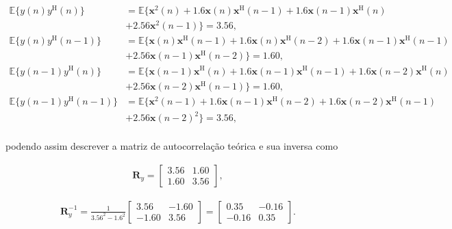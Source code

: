 \documentclass[a4paper,10pt]{article}
\begin{document}
\begin{enumerate}
\begin{enumerate}
						\begin{align*}
							\mathbb{E}\{y(n)y^{\text{H}}(n)\} &= \mathbb{E}\{ \mathbf{x}^{2}(n) + 1.6 \mathbf{x}(n) \mathbf{x}^{\text{H}}(n - 1) + 1.6 \mathbf{x}(n - 1) \mathbf{x}^{\text{H}} (n) \\
							&+ 2.56 \mathbf{x}^{2}(n - 1) \} = 3.56, \\
							\mathbb{E}\{y(n)y^{\text{H}}(n - 1)\} &= \mathbb{E}\{ \mathbf{x}(n) \mathbf{x}^{\text{H}}(n - 1) + 1.6 \mathbf{x}(n) \mathbf{x}^{\text{H}}(n - 2) + 1.6 \mathbf{x}(n - 1) \mathbf{x}^{\text{H}} (n - 1) \\ 
							&+ 2.56 \mathbf{x}(n - 1) \mathbf{x}^{\text{H}}(n - 2) \} = 1.60, \\
							\mathbb{E}\{y(n - 1)y^{\text{H}}(n)\} &= \mathbb{E}\{ \mathbf{x}(n - 1) \mathbf{x}^{\text{H}}(n) + 1.6 \mathbf{x}(n - 1) \mathbf{x}^{\text{H}}(n - 1) + 1.6 \mathbf{x}(n - 2) \mathbf{x}^{\text{H}} (n) \\ 
							&+ 2.56 \mathbf{x}(n - 2) \mathbf{x}^{\text{H}}(n - 1) \} = 1.60, \\
							\mathbb{E}\{y(n - 1)y^{\text{H}}(n - 1)\} &= \mathbb{E}\{ \mathbf{x}^{2}(n - 1) + 1.6 \mathbf{x}(n - 1) \mathbf{x}^{\text{H}}(n - 2) + 1.6 \mathbf{x}(n - 2) \mathbf{x}^{\text{H}} (n - 1) \\ 
							&+ 2.56 \mathbf{x}(n - 2)^{2} \} = 3.56, \\
						\end{align*}
						
						podendo assim descrever a matriz de autocorrelação teórica e sua inversa como
						
						\begin{align}
							\mathbf{R}_{y} =
							\begin{bmatrix}
								3.56 & 1.60 \\
								1.60 & 3.56
							\end{bmatrix},
						\end{align}
						
						\begin{align}
							\mathbf{R}^{-1}_{y} = \frac{1}{3.56^{2} - 1.6^{2}}
							\begin{bmatrix}
								3.56 &  -1.60 \\
								-1.60 & 3.56
							\end{bmatrix} =
							\begin{bmatrix}
								0.35 &  -0.16 \\
								-0.16 & 0.35
							\end{bmatrix}.
						\end{align}
						

\end{enumerate}
\end{enumerate}
\end{document}
